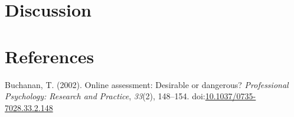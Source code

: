 \documentclass[man,draftall]{apa6}
\begin{document}
\hypertarget{discussion}{%
\section{Discussion}\label{discussion}}

\newpage

\hypertarget{references}{%
\section{References}\label{references}}

\begingroup
\setlength{\parindent}{-0.5in}
\setlength{\leftskip}{0.5in}

\hypertarget{refs}{}
\leavevmode\hypertarget{ref-Buchanan2002}{}%
Buchanan, T. (2002). Online assessment: Desirable or dangerous? \emph{Professional Psychology: Research and Practice}, \emph{33}(2), 148--154. doi:\href{https://doi.org/10.1037/0735-7028.33.2.148}{10.1037/0735-7028.33.2.148}

\endgroup
\end{document}
